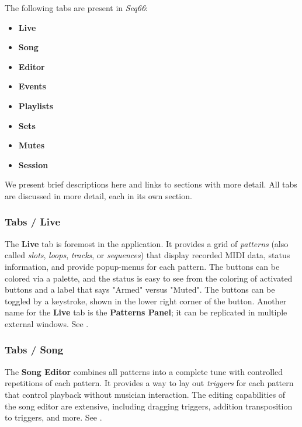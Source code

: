    The following tabs are present in \textsl{Seq66}:

   \begin{itemize}
      \item \textbf{Live}
      \item \textbf{Song}
      \item \textbf{Editor}
      \item \textbf{Events}
      \item \textbf{Playlists}
      \item \textbf{Sets}
      \item \textbf{Mutes}
      \item \textbf{Session}
   \end{itemize}

   We present brief descriptions here and links to sections with more detail.
   All tabs are discussed in more detail, each in its own section.

\subsubsection{Tabs / Live}
\label{subsubsec:introduction_main_tabs_live}

   The \textbf{Live} tab is foremost in the application.
   It provides a grid of \textsl{patterns}
   (also called \textsl{slots}, \textsl{loops}, \textsl{tracks}, or
   \textsl{sequences}) that display recorded MIDI data, status information, and
   provide popup-menus for each pattern.
   The buttons can
   be colored via a palette, and the status is easy to see
   from the coloring of activated buttons and a label that says "Armed"
   versus "Muted".
   The buttons can be toggled by a keystroke, shown in the lower
   right corner of the button.
   Another name for the \textbf{Live} tab is the \textbf{Patterns Panel};
   it can be replicated in multiple external windows.
   See .

\subsubsection{Tabs / Song}
\label{subsubsec:introduction_main_tabs_song}

   The \textbf{Song Editor} combines all patterns
   into a complete tune with controlled repetitions of each pattern.
   It provides a way to lay out \textsl{triggers} for each pattern
   that control playback without musician interaction.
   The editing capabilities of the song editor are extensive, including
   dragging triggers, addition transposition to triggers, and more.
   See .


